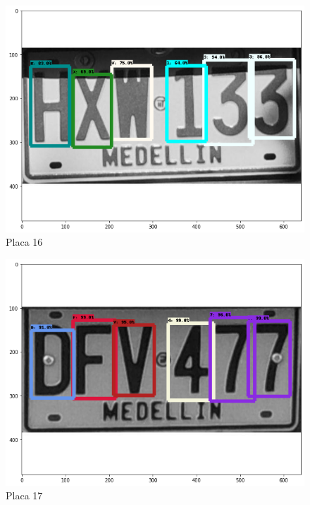 
\begin{figure}[H]
\centering
\includegraphics[width=0.4\linewidth]{imagenes/caracteres detectados/nuevo entrenamiento/6.png}
\caption{Placa 16}
\label{fig:caracteres detectados p18}
\end{figure}

\begin{table}[H]
    \centering
    \caption{Detección de caracteres con porcentajes de acierto placa 16}
    \label{tab:p18}
\end{table}

\begin{figure}[H]
\centering
\includegraphics[width=0.4\linewidth]{imagenes/caracteres detectados/nuevo entrenamiento/10.png}
\caption{Placa 17}
\label{fig:caracteres detectados p19}
\end{figure}



